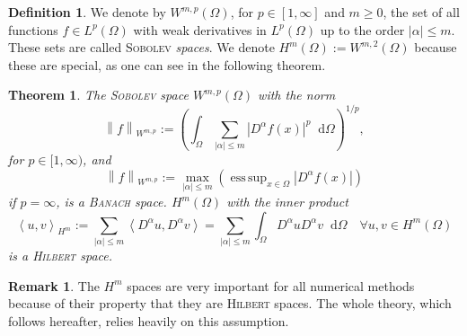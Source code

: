 \documentclass[12pt,a4paper,twoside, open=right]{scrreprt}
\theoremstyle{definition}
\newtheorem{rem}[auf]{Remark}
\newtheorem{defn}[auf]{Definition}
\theoremstyle{plain}
\newtheorem{sa}[auf]{Theorem}
\DeclareMathOperator*{\esssup}{ess\,sup} %
\newcommand{\abs}[1]{\left\vert #1\right\vert}
\newcommand{\dotp}[2]{\left\langle #1,#2\right\rangle}
\newcommand{\norm}[1]{\left\lVert#1\right\rVert}
\newcommand{\D}{\mathop{}\!\mathrm{d}}
\begin{document}
\begin{defn}
    We denote by $W^{m,p}(\Omega)$, for $p\in[1,\infty]$ and $m\ge 0$, the set of all functions $f\in L^p(\Omega)$ with weak derivatives in $L^p(\Omega)$ up to the order $\abs{\alpha}\le m$. These sets are called \textsc{Sobolev} \emph{spaces}. We denote $H^m(\Omega):=W^{m,2}(\Omega)$ because these are special, as one can see in the following theorem.
\end{defn}
\begin{sa}
    The \textsc{Sobolev} space $W^{m,p}(\Omega)$ with the norm
    \begin{equation}
        \norm{f}_{W^{m,p}}:=\left(\int_\Omega\sum_{\abs{\alpha}\le m}\abs{D^{\alpha} f(x)}^p\D\Omega\right)^{1/p},
    \end{equation}
    for $p\in[1,\infty)$, and 
    \begin{equation}
        \norm{f}_{W^{m,p}}:=\max_{\abs{\alpha}\le m}\left(\esssup_{x\in\Omega}\abs{D^{\alpha}f(x)}\right)
    \end{equation}
    if $p=\infty$, is a \textsc{Banach} space. $H^m(\Omega)$ with the inner product
    \begin{equation}
        \dotp{u}{v}_{H^m}:=\sum_{\abs{\alpha}\le m}\dotp{D^{\alpha}u}{D^{\alpha}v}=\sum_{\abs{\alpha}\le m}\int_\Omega D^\alpha u D^\alpha v\D\Omega \quad \forall u,v\in H^m(\Omega)
    \end{equation}
    is a \textsc{Hilbert} space.
\end{sa}
\begin{rem}
    The $H^m$ spaces are very important for all numerical methods because of their property that they are \textsc{Hilbert} spaces. The whole theory, which follows hereafter, relies heavily on this assumption.
\end{rem}
\end{document}
